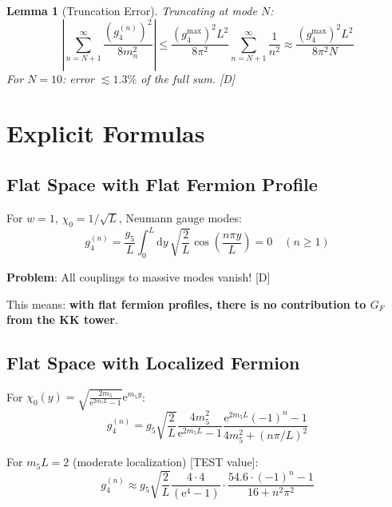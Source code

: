 \documentclass[11pt,a4paper]{article}
\newtheorem{lemma}[theorem]{Lemma}
\newcommand{\dd}{\mathrm{d}}
\newcommand{\ee}{\mathrm{e}}
\begin{document}
\begin{lemma}[Truncation Error]
\label{lem:truncation}
Truncating at mode $N$:
\begin{equation}
\left| \sum_{n=N+1}^{\infty} \frac{(g_4^{(n)})^2}{8m_n^2} \right|
\leq \frac{(g_4^{\text{max}})^2 L^2}{8\pi^2} \sum_{n=N+1}^{\infty} \frac{1}{n^2}
\approx \frac{(g_4^{\text{max}})^2 L^2}{8\pi^2 N}
\label{eq:truncation-error}
\end{equation}
For $N = 10$: error $\lesssim 1.3\%$ of the full sum. [D]
\end{lemma}

\section{Explicit Formulas}
\label{sec:explicit}

\subsection{Flat Space with Flat Fermion Profile}

For $w = 1$, $\chi_0 = 1/\sqrt{L}$, Neumann gauge modes:
\begin{equation}
g_4^{(n)} = \frac{g_5}{L} \int_0^L \dd y\, \sqrt{\frac{2}{L}} \cos\left(\frac{n\pi y}{L}\right) = 0
\quad (n \geq 1)
\label{eq:flat-flat-coupling}
\end{equation}

\textbf{Problem}: All couplings to massive modes vanish! [D]

This means: \textbf{with flat fermion profiles, there is no contribution to $G_F$ from the KK tower}.

\subsection{Flat Space with Localized Fermion}

For $\chi_0(y) = \sqrt{\frac{2m_5}{\ee^{2m_5 L} - 1}} \ee^{m_5 y}$:
\begin{equation}
g_4^{(n)} = g_5 \sqrt{\frac{2}{L}} \frac{4m_5^2}{\ee^{2m_5 L} - 1}
\frac{\ee^{2m_5 L}(-1)^n - 1}{4m_5^2 + (n\pi/L)^2}
\label{eq:localized-coupling}
\end{equation}

For $m_5 L = 2$ (moderate localization) [TEST value]:
\begin{equation}
g_4^{(n)} \approx g_5 \sqrt{\frac{2}{L}} \frac{4 \cdot 4}{(\ee^4 - 1)} \cdot
\frac{54.6 \cdot (-1)^n - 1}{16 + n^2\pi^2}
\label{eq:localized-numeric}
\end{equation}
\end{document}

